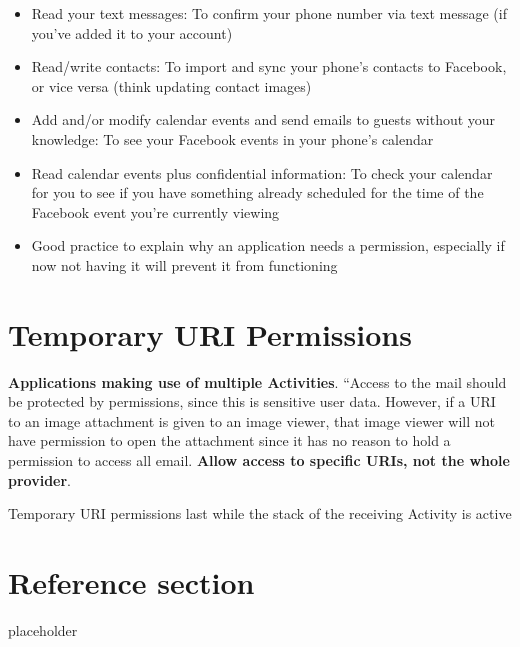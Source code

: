\documentclass{article}
\begin{document}
\begin{itemize}
  \item Read your text messages: To confirm your phone number via text message (if you’ve added it to your account)
  \item Read/write contacts: To import and sync your phone’s contacts to Facebook, or vice versa (think updating contact images)
  \item Add and/or modify calendar events and send emails to guests without your knowledge: To see your Facebook events in your phone’s calendar
  \item Read calendar events plus confidential information: To check your calendar for you to see if you have something already scheduled for the time of the Facebook event you’re currently viewing 
  \item Good practice to explain why an application needs a permission, especially if now not having it will prevent it from functioning
\end{itemize}

\section{Temporary URI Permissions}

\begin{flushleft}
\textbf{Applications making use of multiple Activities}.
“Access	to	the	mail	should	be	protected	by	permissions,	
since	this	is	sensitive	user	data.	However,	if	a	URI	to	an	
image	attachment	is	given	to	an	image	viewer,	that	image	
viewer	will	not	have	permission	to	open	the	attachment	
since	it	has	no	reason	to	hold	a	permission	to	access	all	email.
\textbf{Allow access to specific URIs, not the whole provider}.\\
\end{flushleft}
\begin{flushleft}
Temporary URI permissions last while the stack of the receiving Activity is active
\end{flushleft}


\pagebreak
\section*{Reference section} \label{sec:reference}
\begin{description}
	\item[placeholder] \hfill \\
\end{description}
\end{document}
